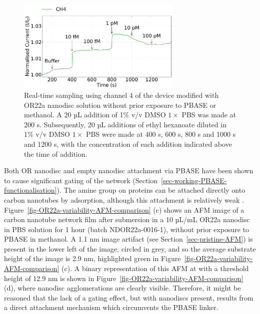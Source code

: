 \documentclass[
  a4paper,
]{scrbook}
\begin{document}
\begin{figure}

{\centering \includegraphics[width=0.7\textwidth,height=\textheight]{figures/ch8/Q4C8_filtered_trunc_arrows_normalised.png}

}

\caption{\label{fig-OR22a-variability-noPBASE-sensing}Real-time sampling
using channel 4 of the device modified with OR22a nanodisc solution
without prior exposure to PBASE or methanol. A 20 µL addition of 1\% v/v
DMSO \(1 \times\) PBS was made at 200 s. Subsequently, 20 µL additions
of ethyl hexanoate diluted in 1\% v/v DMSO \(1 \times\) PBS were made at
400 s, 600 s, 800 s and 1000 s and 1200 s, with the concentration of
each addition indicated above the time of addition.}

\end{figure}

Both OR nanodisc and empty nanodisc attachment via PBASE have been shown
to cause significant gating of the network
(Section~\ref{sec-working-PBASE-functionalisation}). The amine group on
proteins can be attached directly onto carbon nanotubes by adsorption,
although this attachment is relatively weak \autocite{Bradley2004}.
Figure~\ref{fig-OR22a-variability-AFM-comparison} (c) shows an AFM image
of a carbon nanotube network film after submersion in a 10 µL/mL OR22a
nanodisc in PBS solution for 1 hour (batch NDOR22a-0016-1), without
prior exposure to PBASE in methanol. A 1.1 nm image artifact (see
Section~\ref{sec-pristine-AFM}) is present in the lower left of the
image, circled in grey, and so the average substrate height of the image
is 2.9 nm, highlighted green in
Figure~\ref{fig-OR22a-variability-AFM-comparison} (c). A binary
representation of this AFM at with a threshold height of 12.9 nm is
shown in Figure~\ref{fig-OR22a-variability-AFM-comparison} (d), where
nanodisc agglomerations are clearly visible. Therefore, it might be
reasoned that the lack of a gating effect, but with nanodiscs present,
results from a direct attachment mechanism which circumvents the PBASE
linker.
\end{document}
